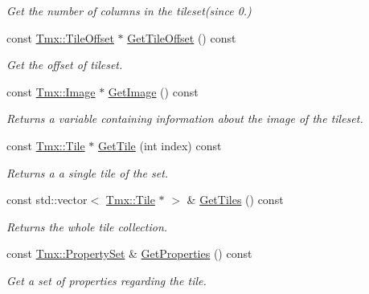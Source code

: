 \begin{DoxyCompactItemize}
\begin{DoxyCompactList}\small\item\em Get the number of columns in the tileset(since 0.) \end{DoxyCompactList}\item 
\hypertarget{classTmx_1_1Tileset_aafe5c4cfe529618c462b51d4002e1107}{const \hyperlink{classTmx_1_1TileOffset}{Tmx\-::\-Tile\-Offset} $\ast$ \hyperlink{classTmx_1_1Tileset_aafe5c4cfe529618c462b51d4002e1107}{Get\-Tile\-Offset} () const }\label{classTmx_1_1Tileset_aafe5c4cfe529618c462b51d4002e1107}

\begin{DoxyCompactList}\small\item\em Get the offset of tileset. \end{DoxyCompactList}\item 
const \hyperlink{classTmx_1_1Image}{Tmx\-::\-Image} $\ast$ \hyperlink{classTmx_1_1Tileset_aa27561446e31c6eee313699b44bd7f78}{Get\-Image} () const 
\begin{DoxyCompactList}\small\item\em Returns a variable containing information about the image of the tileset. \end{DoxyCompactList}\item 
\hypertarget{classTmx_1_1Tileset_a2af81a90aefc762fa3d05f9673f0ff25}{const \hyperlink{classTmx_1_1Tile}{Tmx\-::\-Tile} $\ast$ \hyperlink{classTmx_1_1Tileset_a2af81a90aefc762fa3d05f9673f0ff25}{Get\-Tile} (int index) const }\label{classTmx_1_1Tileset_a2af81a90aefc762fa3d05f9673f0ff25}

\begin{DoxyCompactList}\small\item\em Returns a a single tile of the set. \end{DoxyCompactList}\item 
\hypertarget{classTmx_1_1Tileset_ad01d9d436d3ca1e3be8d59bdd8061c7b}{const std\-::vector$<$ \hyperlink{classTmx_1_1Tile}{Tmx\-::\-Tile} $\ast$ $>$ \& \hyperlink{classTmx_1_1Tileset_ad01d9d436d3ca1e3be8d59bdd8061c7b}{Get\-Tiles} () const }\label{classTmx_1_1Tileset_ad01d9d436d3ca1e3be8d59bdd8061c7b}

\begin{DoxyCompactList}\small\item\em Returns the whole tile collection. \end{DoxyCompactList}\item 
\hypertarget{classTmx_1_1Tileset_a5e45d7cca3b356194f19b0f256ff5476}{const \hyperlink{classTmx_1_1PropertySet}{Tmx\-::\-Property\-Set} \& \hyperlink{classTmx_1_1Tileset_a5e45d7cca3b356194f19b0f256ff5476}{Get\-Properties} () const }\label{classTmx_1_1Tileset_a5e45d7cca3b356194f19b0f256ff5476}

\begin{DoxyCompactList}\small\item\em Get a set of properties regarding the tile. \end{DoxyCompactList}\end{DoxyCompactItemize}


